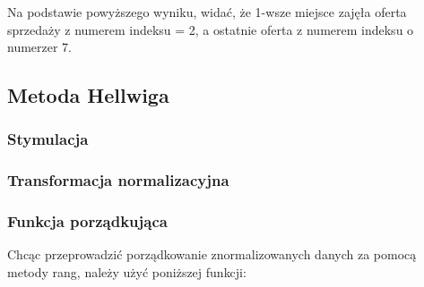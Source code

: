 \documentclass[12pt,a4paper]{report}
\begin{document}
{Na podstawie powyższego wyniku, widać, że 1-wsze miejsce zajęła oferta
sprzedaży z numerem indeksu = 2, a ostatnie oferta z numerem indeksu o
numerzer 7.

\subsection{Metoda Hellwiga}
\subsubsection{Stymulacja} 
\begin{Shaded}
\begin{Highlighting}[]
\NormalTok{)} 
\end{Highlighting}
\end{Shaded}


\subsubsection{Transformacja normalizacyjna}
\begin{Shaded}
\begin{Highlighting}[]
\end{Highlighting}
\end{Shaded}

\subsubsection{Funkcja porządkująca}\label{funkcja-porzadkujaca-metoda-Hellwiga}

Chcąc przeprowadzić porządkowanie znormalizowanych danych za pomocą metody rang, należy użyć poniższej funkcji:

}
\end{document}
